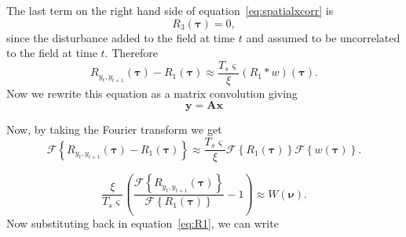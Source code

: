 \documentclass[]{article}
\newcommand{\dean}[1]{\textcolor{red}{#1}}
\begin{document}
The last term on the right hand side of equation~\ref{eq:spatialxcorr} is
\begin{equation}
	R_3(\boldsymbol{\tau}) = 0,
\end{equation}
since the disturbance added to the field at time $t$ and assumed to be uncorrelated to the field at time $t$. Therefore 
\begin{equation}
	R_{y_{t},y_{t+1}}(\boldsymbol{\tau}) - R_1(\boldsymbol{\tau}) \approx \frac{T_s \varsigma}{\xi} \left(R_1 \ast w\right)\left(\boldsymbol{\tau}\right).
\end{equation}
Now we rewrite this equation as a matrix convolution giving
\begin{equation}
	\mathbf{y} = \mathbf{A}\mathbf{x}
\end{equation}

Now, by taking the Fourier transform we get
\begin{equation}
	\mathcal{F}\left\{ R_{y_{t},y_{t+1}}(\boldsymbol{\tau}) - R_1(\boldsymbol{\tau}) \right\} \approx \frac{T_s \varsigma}{\xi} \mathcal{F} \left\{ R_1(\boldsymbol{\tau}) \right\} \mathcal{F}\left\{ w\left(\boldsymbol{\tau}\right)\right\}.
\end{equation}

\begin{equation}
	\frac{\xi}{T_s \varsigma} \left(\frac{\mathcal{F}\left\{R_{y_{t},y_{t+1}}(\boldsymbol{\tau})\right\}}{\mathcal{F}\left\{R_1(\boldsymbol{\tau})\right\}} - 1\right) \approx  W\left(\boldsymbol{\nu}\right).
\end{equation}
Now substituting back in equation~\ref{eq:R1}, we can write
\end{document}

